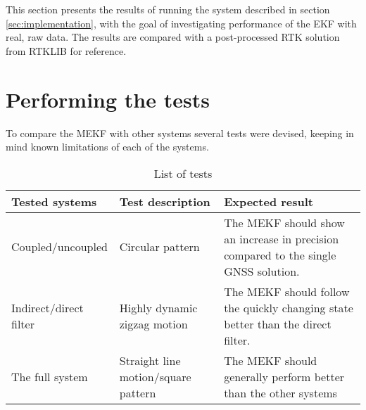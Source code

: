 This section presents the results of running the system described in section \ref{sec:implementation}, with the goal of investigating performance of the EKF with real, raw data. The results are compared with a post-processed RTK solution from RTKLIB for reference.\\

\section{Performing the tests}
To compare the MEKF with other systems several tests were devised, keeping in mind known limitations of each of the systems. 

\begin{table}[!htbp]
\caption{List of tests}
\label{tab:tests}
    \begin{tabular}{|l|l||p{5cm}|}
        \hline
        \textbf{Tested systems} & \textbf{Test description} & \textbf{Expected result}\\
        \hline
        Coupled/uncoupled & Circular pattern & The MEKF should show an increase in precision compared to the     single GNSS solution.\\
        \hline
        Indirect/direct filter &  Highly dynamic zigzag motion & The MEKF should follow the quickly changing     state better than the direct filter.\\
        \hline
        The full system & Straight line motion/square pattern & The MEKF should generally perform better than     the other systems\\
        \hline
    \end{tabular}
\end{table}


    

    